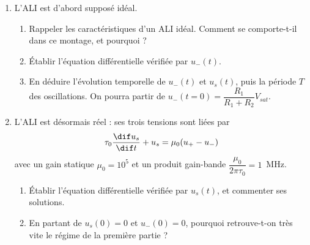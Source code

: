 \begin{enumerate}

	\item L'ALI est d'abord supposé idéal.
	\begin{enumerate}
		\item Rappeler les caractéristiques d'un ALI idéal. Comment se comporte-t-il dans ce montage, et pourquoi ?
		\item Établir l'équation différentielle vérifiée par $u_-(t)$.
		\item En déduire l'évolution temporelle de $u_-(t)$ et $u_s(t)$, puis la période $T$ des oscillations. On pourra partir de $u_-(t=0)=\dfrac{R_1}{R_1+R_2}V_{sat}$.
	\end{enumerate}

	\item L'ALI est désormais réel : ses trois tensions sont liées par
	\begin{align*}
		\tau_0\frac{\dif u_s}{\dif t}+u_s=\mu_0(u_+-u_-)
	\end{align*}
	avec un gain statique $\mu_0=10^{5}$ et un produit gain-bande $\dfrac{\mu_0}{2\pi\tau_0}=1$~MHz.
	\begin{enumerate}
		\item Établir l'équation différentielle vérifiée par $u_s(t)$, et commenter ses solutions.
		\item En partant de $u_s(0)=0$ et $u_-(0)=0$, pourquoi retrouve-t-on très vite le régime de la première partie ?
	\end{enumerate}

\end{enumerate}

\newpage

